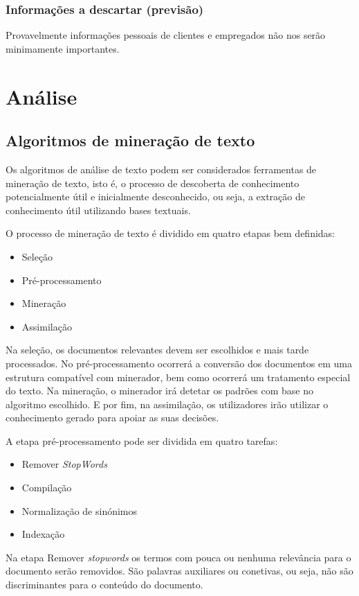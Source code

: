 \documentclass[a4paper,10pt]{article}
\begin{document}
\subsubsection{Informações a descartar (previsão)}

Provavelmente informações pessoais de clientes e empregados não nos serão minimamente importantes.

\section{Análise}
\subsection{Algoritmos de mineração de texto}

Os algoritmos de análise de texto podem ser considerados ferramentas de mineração de texto, isto é, o processo de descoberta de conhecimento potencialmente útil e inicialmente desconhecido, ou seja, a extração de conhecimento útil utilizando bases textuais.

O processo de mineração de texto é dividido em quatro etapas bem definidas:
\begin{itemize}
    \item Seleção
    \item Pré-processamento
    \item Mineração
    \item Assimilação
\end{itemize}

Na seleção, os documentos relevantes devem ser escolhidos e mais tarde processados.
No pré-processamento ocorrerá a conversão dos documentos em uma estrutura compatível com minerador, bem como ocorrerá um tratamento especial do texto.
Na mineração, o minerador irá detetar os padrões com base no algoritmo escolhido.
E por fim, na assimilação, os utilizadores irão utilizar o conhecimento gerado para apoiar as suas decisões.

A etapa pré-processamento pode ser dividida em quatro tarefas:
\begin{itemize}
    \item Remover \textit{StopWords}
    \item Compilação
    \item Normalização de sinónimos
    \item Indexação
\end{itemize}

Na etapa Remover \textit{stopwords} os termos com pouca ou nenhuma relevância para o documento serão removidos.
São palavras auxiliares ou conetivas, ou seja, não são discriminantes para o conteúdo do documento.
\end{document}
